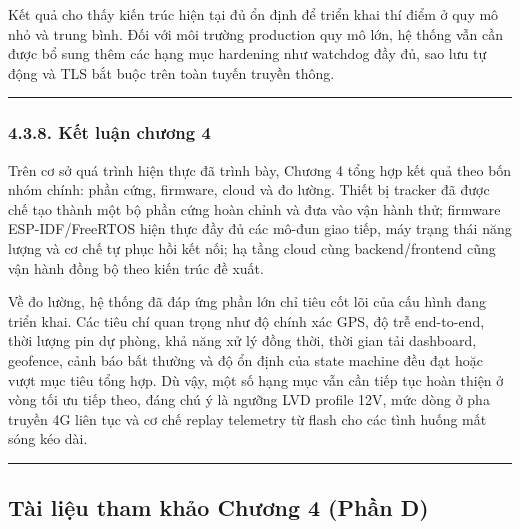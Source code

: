 \documentclass[13pt,a4paper]{extarticle}
\renewcommand{\\}{\thesislongtableorignewline\hline}%
\begin{document}
Kết quả cho thấy kiến trúc hiện tại đủ ổn định để triển khai thí điểm ở
quy mô nhỏ và trung bình. Đối với môi trường production quy mô lớn, hệ
thống vẫn cần được bổ sung thêm các hạng mục hardening như watchdog đầy
đủ, sao lưu tự động và TLS bắt buộc trên toàn tuyến truyền thông.

\begin{center}\rule{0.5\linewidth}{0.5pt}\end{center}

\subsubsection{4.3.8. Kết luận chương
4}\label{438-kux1ebft-luux1eadn-chux1b0ux1a1ng-4}

Trên cơ sở quá trình hiện thực đã trình bày, Chương 4 tổng hợp kết quả
theo bốn nhóm chính: phần cứng, firmware, cloud và đo lường. Thiết bị
tracker đã được chế tạo thành một bộ phần cứng hoàn chỉnh và đưa vào vận
hành thử; firmware ESP-IDF/FreeRTOS hiện thực đầy đủ các mô-đun giao
tiếp, máy trạng thái năng lượng và cơ chế tự phục hồi kết nối; hạ tầng
cloud cùng backend/frontend cũng vận hành đồng bộ theo kiến trúc đề
xuất.

Về đo lường, hệ thống đã đáp ứng phần lớn chỉ tiêu cốt lõi của cấu hình
đang triển khai. Các tiêu chí quan trọng như độ chính xác GPS, độ trễ
end-to-end, thời lượng pin dự phòng, khả năng xử lý đồng thời, thời gian
tải dashboard, geofence, cảnh báo bất thường và độ ổn định của state
machine đều đạt hoặc vượt mục tiêu tổng hợp. Dù vậy, một số hạng mục vẫn
cần tiếp tục hoàn thiện ở vòng tối ưu tiếp theo, đáng chú ý là ngưỡng
LVD profile 12V, mức dòng ở pha truyền 4G liên tục và cơ chế replay
telemetry từ flash cho các tình huống mất sóng kéo dài.

\begin{center}\rule{0.5\linewidth}{0.5pt}\end{center}

\subsection{Tài liệu tham khảo Chương 4 (Phần
D)}\label{tuxe0i-liux1ec7u-tham-khux1ea3o-chux1b0ux1a1ng-4-phux1ea7n-d}
\end{document}
